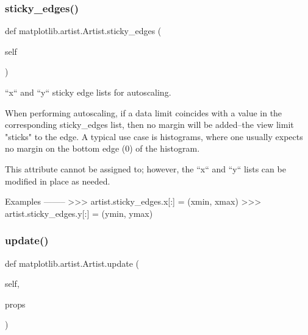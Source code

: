 \mbox{\label{classmatplotlib_1_1artist_1_1Artist_a67b7eecfe551ae8e639eee9b5a1c2a09}} 
\subsubsection{\texorpdfstring{sticky\+\_\+edges()}{sticky\_edges()}}
{\footnotesize\ttfamily def matplotlib.\+artist.\+Artist.\+sticky\+\_\+edges (\begin{DoxyParamCaption}\item[{}]{self }\end{DoxyParamCaption})}

\begin{DoxyVerb}``x`` and ``y`` sticky edge lists for autoscaling.

When performing autoscaling, if a data limit coincides with a value in
the corresponding sticky_edges list, then no margin will be added--the
view limit "sticks" to the edge. A typical use case is histograms,
where one usually expects no margin on the bottom edge (0) of the
histogram.

This attribute cannot be assigned to; however, the ``x`` and ``y``
lists can be modified in place as needed.

Examples
--------
>>> artist.sticky_edges.x[:] = (xmin, xmax)
>>> artist.sticky_edges.y[:] = (ymin, ymax)\end{DoxyVerb}
 \mbox{\label{classmatplotlib_1_1artist_1_1Artist_a9c412b279349ff90f4dc1559460907e2}} 
\subsubsection{\texorpdfstring{update()}{update()}}
{\footnotesize\ttfamily def matplotlib.\+artist.\+Artist.\+update (\begin{DoxyParamCaption}\item[{}]{self,  }\item[{}]{props }\end{DoxyParamCaption})}

